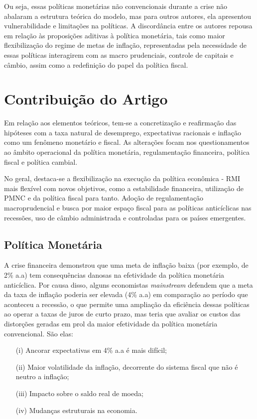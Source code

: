 \documentclass[report]{uftex}
\begin{document}
Ou seja, essas políticas monetárias não convencionais durante a crise não abalaram a estrutura teórica do modelo, mas para outros autores, ela apresentou vulnerabilidade e limitações na políticas. A discordância entre os autores repousa em relação às proposições aditivas à política monetária, tais como maior flexibilização do regime de metas de inflação, representadas pela necessidade de essas políticas interagirem com as macro prudenciais, controle de capitais e câmbio, assim como a redefinição  do papel da política fiscal.

\section{Contribuição do Artigo}

Em relação aos elementos teóricos, tem-se a concretização e reafirmação das hipóteses com a taxa natural de desemprego, expectativas racionais e inflação como um fenômeno monetário e fiscal. As alterações focam nos questionamentos ao âmbito operacional da política monetária, regulamentação financeira, política fiscal e política cambial. 

No geral, destaca-se a flexibilização na execução da política econômica - RMI mais flexível com novos objetivos, como a estabilidade financeira, utilização de PMNC e da política fiscal para tanto. Adoção de regulamentação macroprudencial e busca por maior espaço fiscal para as políticas anticíclicas nas recessões, uso de câmbio administrada e controladas para os países emergentes.

\subsection{Política Monetária}

A crise financeira demonstrou que uma meta de inflação baixa (por exemplo, de 2\% a.a) tem consequências danosas na efetividade da política monetária anticíclica. Por causa disso, alguns economistas \textit{mainstream} defendem que a meta da taxa de inflação poderia ser elevada (4\% a.a) em comparação ao período que aconteceu a recessão, o que permite uma ampliação da eficiência dessas políticas ao operar a taxas de juros de curto prazo, mas teria que avaliar os custos das distorções geradas em prol da maior efetividade da política monetária convencional. São elas: 

\begin{itemize}
	\item[(i)] Ancorar expectativas em 4\% a.a é mais difícil;
	\item[(ii)] Maior volatilidade da inflação, decorrente do sistema fiscal que não é neutro a inflação;
	\item[(iii)] Impacto sobre o saldo real de moeda;
	\item[(iv)] Mudanças estruturais na economia.
\end{itemize}
\end{document}
